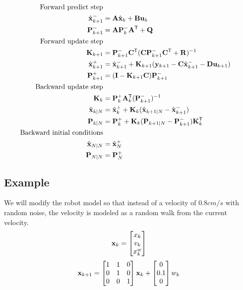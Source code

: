 \begin{theorem}
  \label{thm:kalman_smoother}
  \begin{align}
    \text{Forward predict step} \nonumber \\
    \hat{\mathbf{x}}_{k+1}^- &= \mathbf{A}\hat{\mathbf{x}}_k + \mathbf{B} \mathbf{u}_k \\
    \mathbf{P}_{k+1}^- &= \mathbf{A} \mathbf{P}_k^- \mathbf{A}^\mathsf{T} + \mathbf{Q} \\
    \text{Forward update step} \nonumber \\
    \mathbf{K}_{k+1} &=
      \mathbf{P}_{k+1}^- \mathbf{C}^\mathsf{T} (\mathbf{C}\mathbf{P}_{k+1}^- \mathbf{C}^\mathsf{T} +
      \mathbf{R})^{-1} \\
    \hat{\mathbf{x}}_{k+1}^+ &=
      \hat{\mathbf{x}}_{k+1}^- + \mathbf{K}_{k+1}(\mathbf{y}_{k+1} -
      \mathbf{C} \hat{\mathbf{x}}_{k+1}^- - \mathbf{D}\mathbf{u}_{k+1}) \\
    \mathbf{P}_{k+1}^+ &= (\mathbf{I} - \mathbf{K}_{k+1}\mathbf{C})\mathbf{P}_{k+1}^- \\
    \text{Backward update step} \nonumber \\
    \mathbf{K}_k &= \mathbf{P}_k^+ \mathbf{A}_k^\mathsf{T} (\mathbf{P}_{k+1}^-)^{-1} \\
    \hat{\mathbf{x}}_{k|N} &= \hat{\mathbf{x}}_k^+ +
      \mathbf{K}_k(\hat{\mathbf{x}}_{k+1|N} - \hat{\mathbf{x}}_{k+1}^-) \\
    \mathbf{P}_{k|N} &=
      \mathbf{P}_k^+ + \mathbf{K}_k(\mathbf{P}_{k+1|N} - \mathbf{P}_{k+1}^-)\mathbf{K}_k^\mathsf{T} \\
    \text{Backward initial conditions} \nonumber \\
    \hat{\mathbf{x}}_{N|N} &= \hat{\mathbf{x}}_N^+ \\
    \mathbf{P}_{N|N} &= \mathbf{P}_N^+
  \end{align}
\end{theorem}

\subsection{Example}

We will modify the robot model so that instead of a velocity of $0.8 cm/s$ with
random noise, the velocity is modeled as a random walk from the current
velocity.
\begin{equation}
  \mathbf{x}_k =
  \begin{bmatrix}
    x_k \\
    v_k \\
    x_k^w
  \end{bmatrix}
\end{equation}
\begin{equation}
  \mathbf{x}_{k+1} =
  \begin{bmatrix}
    1 & 1 & 0 \\
    0 & 1 & 0 \\
    0 & 0 & 1
  \end{bmatrix} \mathbf{x}_k +
  \begin{bmatrix}
    0 \\
    0.1 \\
    0
  \end{bmatrix} w_k
\end{equation}

